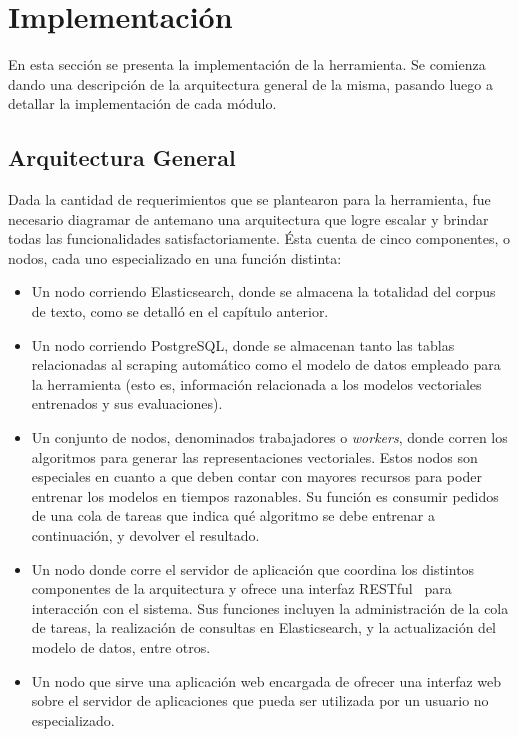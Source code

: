 \section{Implementación}

En esta sección se presenta la implementación de la herramienta. Se comienza dando una descripción
de la arquitectura general de la misma, pasando luego a detallar la implementación de cada
módulo.


\subsection{Arquitectura General}

Dada la cantidad de requerimientos que se plantearon para la herramienta, fue necesario diagramar de
antemano una arquitectura que logre escalar y brindar todas las funcionalidades
satisfactoriamente. Ésta cuenta de cinco componentes, o nodos, cada uno especializado en una función
distinta:

\begin{itemize}

\item Un nodo corriendo Elasticsearch, donde se almacena la totalidad del corpus de texto, como se
detalló en el capítulo anterior.

\item Un nodo corriendo PostgreSQL, donde se almacenan tanto las tablas relacionadas al scraping
automático como el modelo de datos empleado para la herramienta (esto es, información relacionada a
los modelos vectoriales entrenados y sus evaluaciones).

\item Un conjunto de nodos, denominados trabajadores o \textit{workers}, donde corren los algoritmos
para generar las representaciones vectoriales. Estos nodos son especiales en cuanto a que deben
contar con mayores recursos para poder entrenar los modelos en tiempos razonables. Su función es
consumir pedidos de una cola de tareas que indica qué algoritmo se debe entrenar a continuación, y
devolver el resultado.

\item Un nodo donde corre el servidor de aplicación que coordina los distintos componentes de la
arquitectura y ofrece una interfaz RESTful~\cite{Fielding2000} para interacción con el sistema. Sus
funciones incluyen la administración de la cola de tareas, la realización de consultas en Elasticsearch,
y la actualización del modelo de datos, entre otros.

\item Un nodo que sirve una aplicación web encargada de ofrecer una interfaz web sobre el servidor
de aplicaciones que pueda ser utilizada por un usuario no especializado.

\end{itemize}

